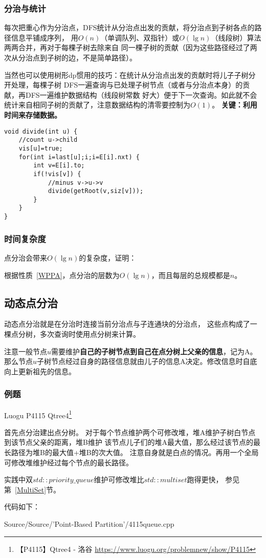 \subsubsection{分治与统计}
每次把重心作为分治点，DFS统计从分治点出发的贡献，将分治点到子树各点的路径信息平铺成序列，
用$O(n)$（单调队列、双指针）或$O(\lg n)$（线段树）算法两两合并，再对于每棵子树去除来自
同一棵子树的贡献（因为这些路径经过了两次从分治点到子树的边，不是简单路径）。

当然也可以使用树形dp惯用的技巧：在统计从分治点出发的贡献时将儿子子树分开处理，每棵子树
DFS一遍查询与已处理子树节点（或者与分治点本身）的贡献，再DFS一遍维护数据结构（线段树常数
好大）便于下一次查询。如此就不会统计来自相同子树的贡献了，注意数据结构的清零要控制为$O(1)$。
{\bfseries 关键：利用时间来存储数据。}

\begin{lstlisting}[title=divide]
void divide(int u) {
    //count u->child
    vis[u]=true;
    for(int i=last[u];i;i=E[i].nxt) {
        int v=E[i].to;
        if(!vis[v]) {
            //minus v->u->v
            divide(getRoot(v,siz[v]));
        }
    }
}
\end{lstlisting}

\subsubsection{时间复杂度}
点分治会带来$O(\lg n)$的复杂度，证明：

根据性质~\ref{WPPA}，点分治的层数为$O(\lg n)$，而且每层的总规模都是$n$。

\subsection{动态点分治}
动态点分治就是在分治时连接当前分治点与子连通块的分治点，
这些点构成了一棵点分树，多次查询时使用点分树来计算。

注意一般节点$u$需要维护{\bfseries 自己的子树节点到自己在点分树上父亲的信息}，记为A。
那么节点$u$子树节点经过自身的路径信息就由儿子的信息A决定。修改信息时自底向上更新祖先的信息。

\subsubsection{例题}

Luogu P4115 Qtree4\footnote{【P4115】Qtree4 - 洛谷
\url{https://www.luogu.org/problemnew/show/P4115}}

首先点分治建出点分树。
对于每个节点维护两个可修改堆，堆A维护子树白节点到该节点父亲的距离，堆B维护
该节点儿子们的堆A最大值，那么经过该节点的最长路径为堆B的最大值+堆B的次大值。
注意自身就是白点的情况。再用一个全局可修改堆维护经过每个节点的最长路径。

实践中双$std::priority\_queue$维护可修改堆比$std::multiset$跑得更快，
参见第~\ref{MultiSet}节。

代码如下：

{Source/Source/'Point-Based Partition'/4115queue.cpp}
